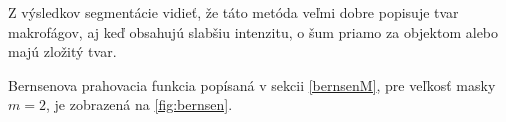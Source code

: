 \documentclass[a4paper,11pt,oneside]{article}%
\begin{document}
Z výsledkov segmentácie vidieť, že táto metóda veľmi dobre popisuje tvar makrofágov, aj keď obsahujú   slabšiu intenzitu, o šum priamo za objektom alebo majú zložitý tvar.  

Bernsenova prahovacia funkcia popísaná v sekcii \ref{bernsenM}, pre veľkosť masky $m = 2$, je zobrazená na \ref{fig:bernsen}.

\begin{figure}[H]  
    \hspace{5px}

\end{figure}
\end{document}
